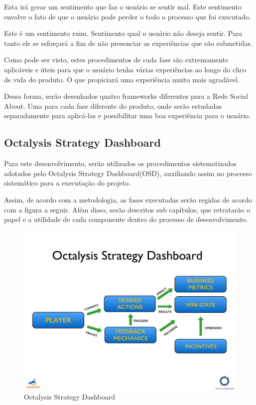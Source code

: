 Esta irá gerar um sentimento que faz o usuário se sentir mal. Este sentimento
envolve o fato de que o usuário pode perder o todo o processo que foi executado.


Este é um sentimento ruim. Sentimento qual o usuário não deseja sentir. Para tanto
ele se esforçará a fim de não presenciar as experiências que são submetidas.

Como pode ser visto, estes procedimentos de cada fase são extremamente aplicáveis
e úteis para que o usuário tenha várias experiências ao longo do clico de vida do
produto. O que propiciará uma experiência muito mais agradável.

Dessa forma, serão desenhados quatro frameworks diferentes para a Rede Social About.
Uma para cada fase diferente do produto, onde serão estudadas separadamente para
aplicá-las e possibilitar uma boa experiência para o usuário.

\subsection{Octalysis Strategy Dashboard}
\label{sec:octalysisdashborad}
Para este desenvolvimento, serão utilizados os procedimentos sistematizados adotados
pelo Octalysis Strategy Dashboard(OSD), auxiliando assim no processo sistemático para
a executação do projeto. 

Assim, de acordo com a metodologia, as fases executadas serão regidas de acordo com a
figura a seguir.  Além disso, serão descritos sub capítulos, que retratarão o papel e a 
utilidade de cada componente dentro do processo de desenvolvimento.


 \begin{figure}[h]
     \centering

     \includegraphics[width=450px, scale=1]{figuras/dashboard}
     \caption{Octalysis Strategy Dashboard}

     \label{fig:dashboard}
 \end{figure}

